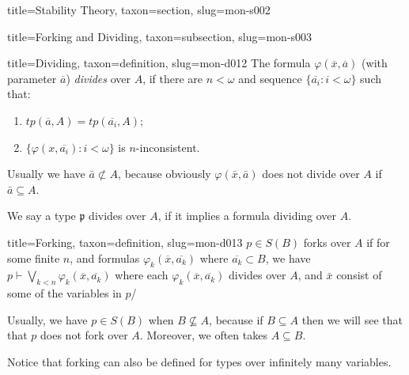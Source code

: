 \documentclass[a4paper]{article}
\begin{document}
\begin{tree}{title={Stability Theory}, taxon={section}, slug={mon-s002}}
\begin{tree}{title={Forking and Dividing}, taxon={subsection}, slug={mon-s003}}
\begin{tree}{title={Dividing}, taxon={definition}, slug={mon-d012}}
The formula \(\varphi ( \overline {x}, \overline {a})\) (with parameter \(\overline {a}\)) \emph{divides} over \(A\), if there are \(n< \omega\) and sequence \(\{ \overline {a_i}:i< \omega \}\) such that:
\begin{enumerate}
\item{\(tp( \overline {a},A)=tp( \overline {a_i},A)\);}
    \item{\(\{ \varphi (x, \overline {a_i}):i< \omega \}\) is \(n\)-inconsistent.}
\end{enumerate}
Usually we have \(\bar {a} \not \subset  A\), because obviously \(\varphi ( \bar {x}, \bar {a})\) does not divide over \(A\) if \(\bar {a} \subseteq  A\).

We say a type \(\mathfrak {p}\) divides over \(A\), if it implies a formula dividing over \(A\).

\end{tree}

\begin{tree}{title={Forking}, taxon={definition}, slug={mon-d013}}
 \(p \in  S(B)\) forks over \(A\) if for some finite \(n\), and formulas \(\varphi _k( \overline {x}, \overline {a_{k}})\) where \(\overline {a_k} \subset  B\), we have \(p \vdash \bigvee _{k<n} \varphi _k( \overline {x}, \overline {a_{k}})\) where each \(\varphi _k( \overline {x}, \overline {a_{k}})\) divides over \(A\), and \(\bar {x}\) consist of some of the variables in \(p\)/

Usually, we have \(p \in  S(B)\) when \(B \not \subseteq  A\), because if \(B \subseteq  A\) then we will see that that \(p\) does not fork over \(A\). Moreover, we often takes \(A \subseteq  B\).

Notice that forking can also be defined for types over infinitely many variables.

\end{tree}

\end{tree}

\end{tree}


    
    
\end{document}
